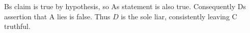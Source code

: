B\textquotesingle s claim is true by hypothesis, so A\textquotesingle s statement is also true. Consequently D\textquotesingle s assertion that A lies is false. Thus $\boxed{D}$ is the sole liar, consistently leaving C truthful.
